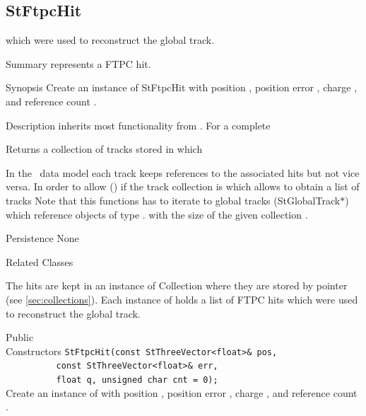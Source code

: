 \subsection{StFtpcHit}
 
    which were used to reconstruct the global track. 
\begin{Entry}
\item[Summary]
     represents a FTPC hit.

\item[Synopsis]
    Create an instance of StFtpcHit with position ,
    position error , charge , and reference count .

\item[Description]
     inherits most functionality from .  For a complete
    
    Returns a collection of tracks stored in  which

    In the \StEvent\ data model each track keeps references to the
    associated hits but not vice versa. In order to allow
    () if the track collection is
     which allows to obtain a list of tracks
      Note that this functions has to iterate
    to global tracks (StGlobalTrack$*$) which reference objects of type
    .
    with the size of the given collection .
\item[Persistence]
    None

\item[Related Classes]
    
    The hits are kept in an instance of Collection
    where they are stored by pointer (see \ref{sec:collections}).
    Each instance of  holds a list of FTPC hits
    which were used to reconstruct the global track.

\item[Public\\ Constructors]
    \verb+StFtpcHit(const StThreeVector<float>& pos,+\\
    \verb+          const StThreeVector<float>& err,+\\
    \verb+          float q, unsigned char cnt = 0);+\\
    Create an instance of  with position ,
    position error , charge , and reference count .


\end{Entry}

